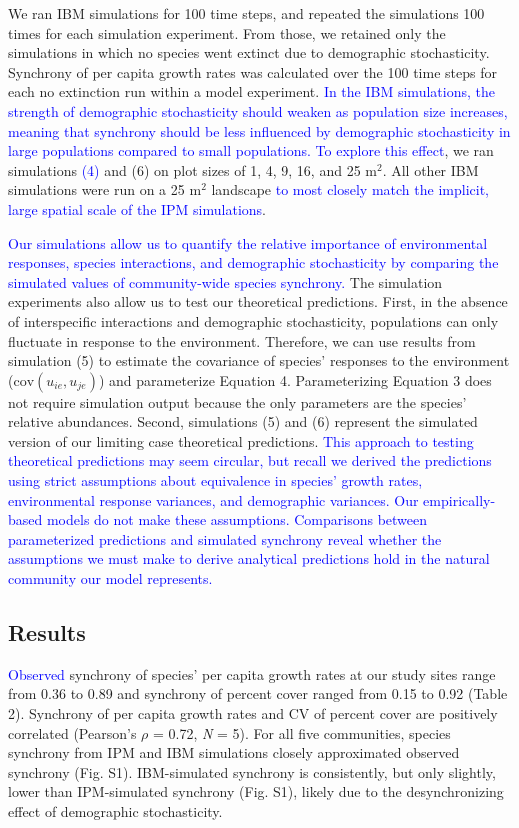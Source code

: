 \documentclass[12pt,]{article}
\begin{document}
We ran IBM simulations for 100 time steps, and repeated the simulations
100 times for each simulation experiment. From those, we retained only
the simulations in which no species went extinct due to demographic
stochasticity. Synchrony of per capita growth rates was calculated over
the 100 time steps for each no extinction run within a model experiment.
\textcolor{blue}{In the IBM simulations, the strength of demographic stochasticity should weaken as population size increases, meaning that synchrony should be less influenced by demographic stochasticity in large populations compared to small populations.
To explore this effect}, we ran simulations \textcolor{blue}{(4)} and
(6) on plot sizes of 1, 4, 9, 16, and 25 \(\text{m}^2\). All other IBM
simulations were run on a 25 \(\text{m}^2\) landscape
\textcolor{blue}{to most closely match the implicit, large spatial scale of the IPM simulations}.

\textcolor{blue}{Our simulations allow us to quantify the relative importance of environmental responses, species interactions, and demographic stochasticity by comparing the simulated values of community-wide species synchrony.}
The simulation experiments also allow us to test our theoretical
predictions. First, in the absence of interspecific interactions and
demographic stochasticity, populations can only fluctuate in response to
the environment. Therefore, we can use results from simulation (5) to
estimate the covariance of species' responses to the environment
(\(\text{cov}(u_{ie}, u_{je})\)) and parameterize Equation 4.
Parameterizing Equation 3 does not require simulation output because the
only parameters are the species' relative abundances. Second,
simulations (5) and (6) represent the simulated version of our limiting
case theoretical predictions.
\textcolor{blue}{This approach to testing theoretical predictions may seem circular, but recall we derived the predictions using strict assumptions about equivalence in species' growth rates, environmental response variances, and demographic variances.
Our empirically-based models do not make these assumptions.
Comparisons between parameterized predictions and simulated synchrony reveal whether the assumptions we must make to derive analytical predictions hold in the natural community our model represents.}

\subsection{Results}

\textcolor{blue}{Observed} synchrony of species' per capita growth rates
at our study sites range from 0.36 to 0.89 and synchrony of percent
cover ranged from 0.15 to 0.92 (Table 2). Synchrony of per capita growth
rates and CV of percent cover are positively correlated (Pearson's
\(\rho\) = 0.72, \emph{N} = 5). For all five communities, species
synchrony from IPM and IBM simulations closely approximated observed
synchrony (Fig. S1). IBM-simulated synchrony is consistently, but only
slightly, lower than IPM-simulated synchrony (Fig. S1), likely due to
the desynchronizing effect of demographic stochasticity.
\end{document}
